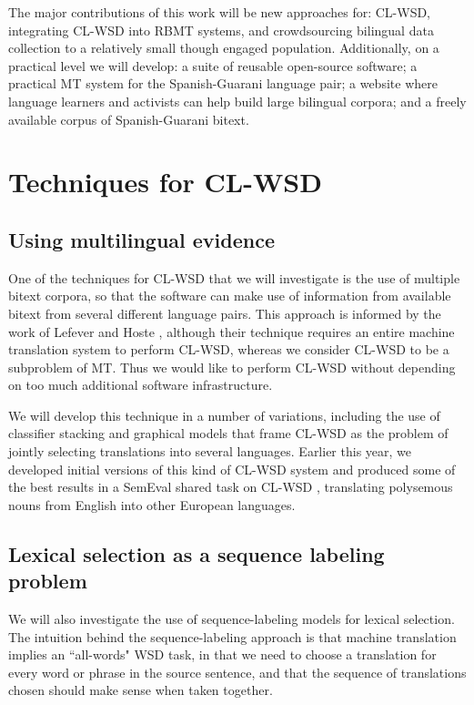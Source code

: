 \documentclass{article}
\begin{document}

The major contributions of this work will be new approaches for: CL-WSD,
integrating CL-WSD into RBMT systems, and crowdsourcing bilingual data
collection to a relatively small though engaged population.
Additionally, on a practical level we will develop: a suite of reusable
open-source software; a practical MT system for the Spanish-Guarani language
pair; a website where language learners and activists can help build large
bilingual corpora; and a freely available corpus of Spanish-Guarani bitext.


\section{Techniques for CL-WSD}

\subsection{Using multilingual evidence}
One of the techniques for CL-WSD that we will investigate is the use of
multiple bitext corpora, so that the software can make use of information from
available bitext from several different language pairs. This approach is
informed by the work of Lefever and Hoste
\cite{lefever-hoste-decock:2011:ACL-HLT2011}, although their technique requires
an entire machine translation system to perform CL-WSD, whereas we consider
CL-WSD to be a subproblem of MT. Thus we would like to perform CL-WSD without
depending on too much additional software infrastructure.

We will develop this technique in a number of variations, including the use of
classifier stacking and graphical models that frame CL-WSD as the problem
of jointly selecting translations into several languages. Earlier this year,
we developed initial versions of this kind of CL-WSD system
\cite{rudnick-liu-gasser:2013:SemEval-2013} and produced some of the best
results in a SemEval shared task on CL-WSD \cite{task10},
translating polysemous nouns from English into other European languages.

\subsection{Lexical selection as a sequence labeling problem}
We will also investigate the use of sequence-labeling models for
lexical selection.  The intuition behind the sequence-labeling approach is that
machine translation implies an ``all-words" WSD task, in that we need to choose
a translation for every word or phrase in the source sentence, and that the
sequence of translations chosen should make sense when taken together.
\end{document}
